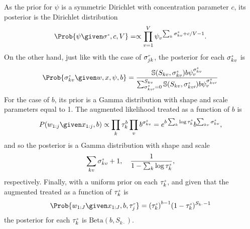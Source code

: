 As the prior for $\psi$ is a symmetric Dirichlet with concentration parameter $c$,
its posterior is the Dirichlet distribution
\[
	\Prob{\psi \given \stirS{s}, c, V}
= \propto \prod_{v=1}^V {\psi_v}^{\sum_k\stirs{s}{kv} + c/V-1}.
\]
On the other hand, just like with the case of $\sigma^{\text{\tiny{$r$}}}_{jk}$, the posterior for each $\sigma^{\text{\tiny{$s$}}}_{kv}$ is 
\[
	\Prob{\stirs{s}{kv} \given w, x, \psi, b} = 
\frac{\mathbb{S}(S_{kv},\stirs{s}{kv})b\psi_{v}^{\stirs{s}{kv}}} { \sum_{\stirs{s}{kv\prime}=0}^{S_{kv}}\mathbb{S}(S_{kv},\stirs{s}{kv\prime})b\psi_{v}^{\stirs{s}{kv\prime}}}
\]
For the case of $b$, its prior is a Gamma distribution with shape and scale
parameters equal to 1.  The augmented likelihood treated as a function of $b$ is
\[P(w_{1:j} \given x_{1:j}, b) \propto  \prod_{k}\tau_{k}^{b} \prod_{v} b^{\stirs{s}{kv}} = e^{b\sum_{k}\log\stirt{s}{k}} b^{\sum_{kv}\stirs{s}{kv}},\]
and so the posterior is a Gamma distribution with shape and scale
\[
	\sum_{kv}\sigma^{\text{\tiny{$s$}}}_{kv} + 1,\quad \frac{1}{1-\sum_{k}\log\tau^{\text{\tiny{$s$}}}_{k}},
\]
respectively.
Finally, with a uniform prior on each $\tau^{\text{\tiny{$s$}}}_{k}$, and given that the augmented treated as a function of $\tau^{\text{\tiny{$s$}}}_{k}$ is
\[
	\Prob{w_{1:J} \given x_{1:J}, b, \stirt{r}{j}} = {(\stirt{s}{k})}^{b-1} (1-\stirt{s}{k})^{S_{k\cdot}-1} 
\]
the posterior for each $\tau^{\text{\tiny{$s$}}}_{k}$ is $\textrm{Beta}(b,S_{k\cdot})$.
